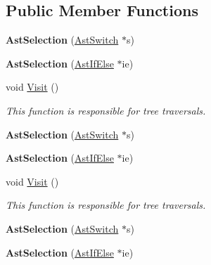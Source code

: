 \subsection*{Public Member Functions}
\begin{DoxyCompactItemize}
\item 
\hypertarget{classAstSelection_afac2e382bc352b49ca61e6017eb58130}{{\bfseries Ast\-Selection} (\hyperlink{classAstSwitch}{Ast\-Switch} $\ast$s)}\label{classAstSelection_afac2e382bc352b49ca61e6017eb58130}

\item 
\hypertarget{classAstSelection_aaed7d12c4b620b13f70e2d19e15eff0c}{{\bfseries Ast\-Selection} (\hyperlink{classAstIfElse}{Ast\-If\-Else} $\ast$ie)}\label{classAstSelection_aaed7d12c4b620b13f70e2d19e15eff0c}

\item 
void \hyperlink{classAstSelection_a811114a424918b2141b5eb0e341c3a22}{Visit} ()
\begin{DoxyCompactList}\small\item\em This function is responsible for tree traversals. \end{DoxyCompactList}\item 
\hypertarget{classAstSelection_afac2e382bc352b49ca61e6017eb58130}{{\bfseries Ast\-Selection} (\hyperlink{classAstSwitch}{Ast\-Switch} $\ast$s)}\label{classAstSelection_afac2e382bc352b49ca61e6017eb58130}

\item 
\hypertarget{classAstSelection_aaed7d12c4b620b13f70e2d19e15eff0c}{{\bfseries Ast\-Selection} (\hyperlink{classAstIfElse}{Ast\-If\-Else} $\ast$ie)}\label{classAstSelection_aaed7d12c4b620b13f70e2d19e15eff0c}

\item 
void \hyperlink{classAstSelection_a811114a424918b2141b5eb0e341c3a22}{Visit} ()
\begin{DoxyCompactList}\small\item\em This function is responsible for tree traversals. \end{DoxyCompactList}\item 
\hypertarget{classAstSelection_afac2e382bc352b49ca61e6017eb58130}{{\bfseries Ast\-Selection} (\hyperlink{classAstSwitch}{Ast\-Switch} $\ast$s)}\label{classAstSelection_afac2e382bc352b49ca61e6017eb58130}

\item 
\hypertarget{classAstSelection_aaed7d12c4b620b13f70e2d19e15eff0c}{{\bfseries Ast\-Selection} (\hyperlink{classAstIfElse}{Ast\-If\-Else} $\ast$ie)}\label{classAstSelection_aaed7d12c4b620b13f70e2d19e15eff0c}


\end{DoxyCompactItemize}
